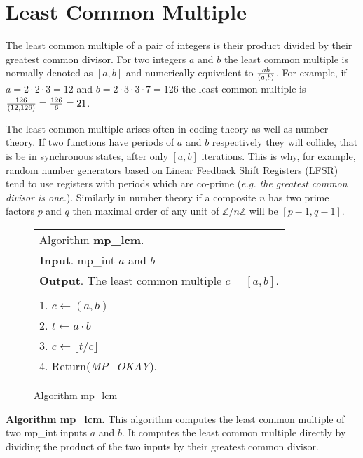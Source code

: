 \documentclass[b5paper]{book}
\def\Z{{\mathbb Z}}
\begin{document}
\section{Least Common Multiple}
The least common multiple of a pair of integers is their product divided by their greatest common divisor.  For two integers $a$ and $b$ the
least common multiple is normally denoted as $[ a, b ]$ and numerically equivalent to ${ab} \over {(a, b)}$.  For example, if $a = 2 \cdot 2 \cdot 3 = 12$
and $b = 2 \cdot 3 \cdot 3 \cdot 7 = 126$ the least common multiple is ${126 \over {(12, 126)}} = {126 \over 6} = 21$.

The least common multiple arises often in coding theory as well as number theory.  If two functions have periods of $a$ and $b$ respectively they will
collide, that is be in synchronous states, after only $[ a, b ]$ iterations.  This is why, for example, random number generators based on 
Linear Feedback Shift Registers (LFSR) tend to use registers with periods which are co-prime (\textit{e.g. the greatest common divisor is one.}).  
Similarly in number theory if a composite $n$ has two prime factors $p$ and $q$ then maximal order of any unit of $\Z/n\Z$ will be $[ p - 1, q - 1] $.

\begin{figure}[!here]
\begin{small}
\begin{center}
\begin{tabular}{l}
\hline Algorithm \textbf{mp\_lcm}. \\
\textbf{Input}.   mp\_int $a$ and $b$ \\
\textbf{Output}.  The least common multiple $c = [a, b]$.  \\
\hline \\
1.  $c \leftarrow (a, b)$ \\
2.  $t \leftarrow a \cdot b$ \\
3.  $c \leftarrow \lfloor t / c \rfloor$ \\
4.  Return(\textit{MP\_OKAY}). \\
\hline
\end{tabular}
\end{center}
\end{small}
\caption{Algorithm mp\_lcm}
\end{figure}
\textbf{Algorithm mp\_lcm.}
This algorithm computes the least common multiple of two mp\_int inputs $a$ and $b$.  It computes the least common multiple directly by
dividing the product of the two inputs by their greatest common divisor.
\end{document}
